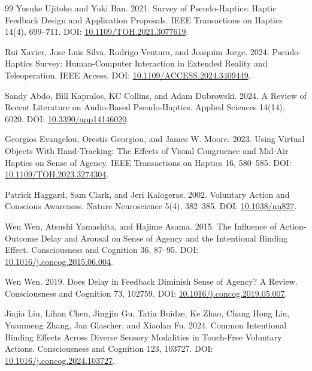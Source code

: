 \documentclass[11pt]{article}
\begin{document}
\begin{thebibliography}{99}
Yusuke Ujitoko and Yuki Ban. 2021. Survey of Pseudo-Haptics: Haptic Feedback Design and Application Proposals. IEEE Transactions on Haptics 14(4), 699--711. DOI: \href{https://doi.org/10.1109/TOH.2021.3077619}{10.1109/TOH.2021.3077619}.

Rui Xavier, Jose Luis Silva, Rodrigo Ventura, and Joaquim Jorge. 2024. Pseudo-Haptics Survey: Human-Computer Interaction in Extended Reality and Teleoperation. IEEE Access. DOI: \href{https://doi.org/10.1109/ACCESS.2024.3409449}{10.1109/ACCESS.2024.3409449}.

Sandy Abdo, Bill Kapralos, KC Collins, and Adam Dubrowski. 2024. A Review of Recent Literature on Audio-Based Pseudo-Haptics. Applied Sciences 14(14), 6020. DOI: \href{https://doi.org/10.3390/app14146020}{10.3390/app14146020}.

Georgios Evangelou, Orestis Georgiou, and James W. Moore. 2023. Using Virtual Objects With Hand-Tracking: The Effects of Visual Congruence and Mid-Air Haptics on Sense of Agency. IEEE Transactions on Haptics 16, 580--585. DOI: \href{https://doi.org/10.1109/TOH.2023.3274304}{10.1109/TOH.2023.3274304}.

Patrick Haggard, Sam Clark, and Jeri Kalogeras. 2002. Voluntary Action and Conscious Awareness. Nature Neuroscience 5(4), 382--385. DOI: \href{https://doi.org/10.1038/nn827}{10.1038/nn827}.

Wen Wen, Atsushi Yamashita, and Hajime Asama. 2015. The Influence of Action-Outcome Delay and Arousal on Sense of Agency and the Intentional Binding Effect. Consciousness and Cognition 36, 87--95. DOI: \href{https://doi.org/10.1016/j.concog.2015.06.004}{10.1016/j.concog.2015.06.004}.

Wen Wen. 2019. Does Delay in Feedback Diminish Sense of Agency? A Review. Consciousness and Cognition 73, 102759. DOI: \href{https://doi.org/10.1016/j.concog.2019.05.007}{10.1016/j.concog.2019.05.007}.

Jiajia Liu, Lihan Chen, Jingjin Gu, Tatia Buidze, Ke Zhao, Chang Hong Liu, Yuanmeng Zhang, Jan Glascher, and Xiaolan Fu. 2024. Common Intentional Binding Effects Across Diverse Sensory Modalities in Touch-Free Voluntary Actions. Consciousness and Cognition 123, 103727. DOI: \href{https://doi.org/10.1016/j.concog.2024.103727}{10.1016/j.concog.2024.103727}.


\end{thebibliography}
\end{document}
